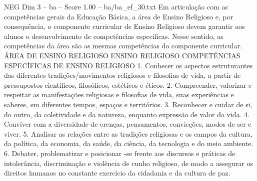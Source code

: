 \begin{textsample}{NEG Dim 3 – ba – Score 1.00 – ba/ba\_ef\_30.txt}  \label{ex:f3_neg_113}
Em articulação com as competências gerais da Educação Básica, a área de Ensino Religioso e, por consequência, o componente curricular de Ensino Religioso devem garantir aos alunos o desenvolvimento de competências específicas.
Nesse sentido, as competências da área são as mesmas competências do componente curricular.
ÁREA DE ENSINO RELIGIOSO ENSINO RELIGIOSO COMPETÊNCIAS ESPECÍFICAS DE ENSINO RELIGIOSO 1.
Conhecer os aspectos estruturantes das diferentes tradições/movimentos religiosos e filosofias de vida, a partir de pressupostos científicos, filosóficos, estéticos e éticos. 2.
Compreender, valorizar e respeitar as manifestações religiosas e filosofias de vida, suas experiências e saberes, em diferentes tempos, espaços e territórios. 3.
Reconhecer e cuidar de si, do outro, da coletividade e da natureza, enquanto expressão de valor da vida. 4.
Conviver com a diversidade de crenças, pensamentos, convicções, modos de ser e viver. 5.
Analisar as relações entre as tradições religiosas e os campos da cultura, da política, da economia, da saúde, da ciência, da tecnologia e do meio ambiente. 6.
Debater, problematizar e posicionar -se frente aos discursos e práticas de intolerância, discriminação e violência de cunho religioso, de modo a assegurar os direitos humanos no constante exercício da cidadania e da cultura de paz.

\end{textsample}
